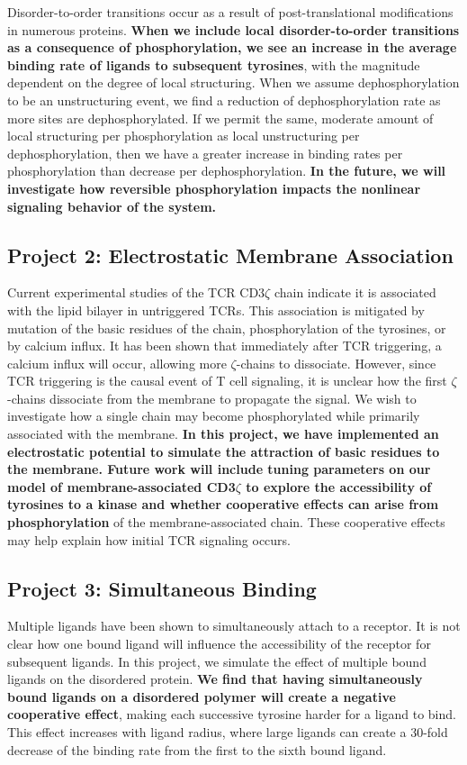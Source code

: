 \documentclass[onecolumn]{article}
\begin{document}
Disorder-to-order transitions occur as a result of post-translational modifications in numerous proteins. \textbf{When we include local disorder-to-order transitions as a consequence of phosphorylation, we see an increase in the average binding rate of ligands to subsequent tyrosines}, with the magnitude dependent on the degree of local structuring. When we assume dephosphorylation to be an unstructuring event, we find a reduction of dephosphorylation rate as more sites are dephosphorylated. If we permit the same, moderate amount of local structuring per phosphorylation as local unstructuring per dephosphorylation, then we have a greater increase in binding rates per phosphorylation than decrease per dephosphorylation. \textbf{In the future, we will investigate how reversible phosphorylation impacts the nonlinear signaling behavior of the system.}

\subsection*{Project 2: Electrostatic Membrane Association}

Current experimental studies of the TCR CD3$\zeta$ chain indicate it is associated with the lipid bilayer in untriggered TCRs. This association is mitigated by mutation of the basic residues of the chain, phosphorylation of the tyrosines, or by calcium influx. It has been shown that immediately after TCR triggering, a calcium influx will occur, allowing more $\zeta$-chains to dissociate. However, since TCR triggering is the causal event of T cell signaling, it is unclear how the first $\zeta$-chains dissociate from the membrane to propagate the signal. We wish to investigate how a single chain may become phosphorylated while primarily associated with the membrane. \textbf{In this project, we have implemented an electrostatic potential to simulate the attraction of basic residues to the membrane. Future work will include tuning parameters on our model of membrane-associated CD3$\zeta$ to explore the accessibility of tyrosines to a kinase and whether cooperative effects can arise from phosphorylation} of the membrane-associated chain. These cooperative effects may help explain how initial TCR signaling occurs.

\subsection*{Project 3: Simultaneous Binding}

Multiple ligands have been shown to simultaneously attach to a receptor. It is not clear how one bound ligand will influence the accessibility of the receptor for subsequent ligands. In this project, we simulate the effect of multiple bound ligands on the disordered protein. \textbf{We find that having simultaneously bound ligands on a disordered polymer will create a negative cooperative effect}, making each successive tyrosine harder for a ligand to bind. This effect increases with ligand radius, where large ligands can create a 30-fold decrease of the binding rate from the first to the sixth bound ligand.
\end{document}
